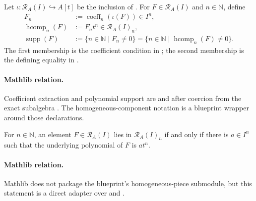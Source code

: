 \begin{definition}
  \label{def:nagata-rees-components}
  \leanok

  Let $\iota\colon\mathcal R_A(I)\hookrightarrow A[t]$ be the inclusion of
  .  For $F\in\mathcal R_A(I)$ and
  $n\in\mathbb N$, define
  \[
  \begin{aligned}
    F_n&:=\operatorname{coeff}_n(\iota(F))\in I^n,\\
    \operatorname{hcomp}_n(F)&:=F_nt^n\in\mathcal R_A(I)_n,\\
    \operatorname{supp}(F)
      &:=\{n\in\mathbb N\mid F_n\ne0\}
       =\{n\in\mathbb N\mid\operatorname{hcomp}_n(F)\ne0\}.
  \end{aligned}
  \]
  The first membership is the coefficient condition in
  ; the second membership is the defining
  equality in .

  \paragraph{Mathlib relation.}
  Coefficient extraction and polynomial support are
  \texttt{} and
  \texttt{} after coercion from the exact
  subalgebra \texttt{}.  The homogeneous-component
  notation is a blueprint wrapper around those declarations.
\end{definition}

\begin{lemma}
  \label{lemma:nagata-rees-piece-membership}
  \leanok

  For $n\in\mathbb N$, an element $F\in\mathcal R_A(I)$ lies in
  $\mathcal R_A(I)_n$ if and only if
  there is $a\in I^n$ such that the underlying polynomial of $F$ is
  $at^n$.

  \paragraph{Mathlib relation.}
  Mathlib does not package the blueprint's homogeneous-piece submodule, but
  this statement is a direct adapter over
  \texttt{} and
  \texttt{}.
\end{lemma}

